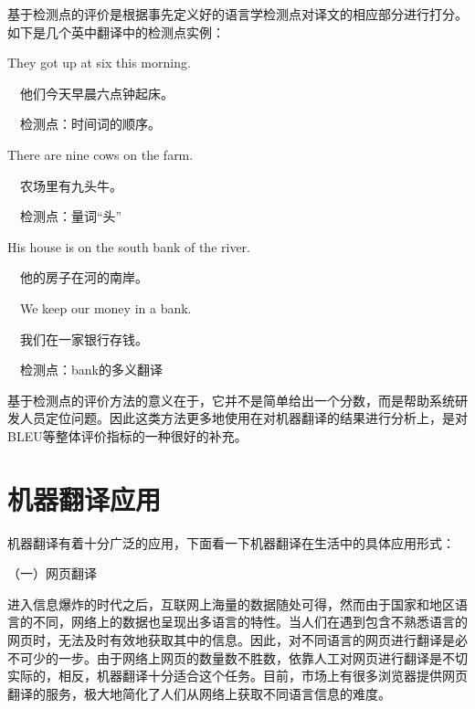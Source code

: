 \parinterval 基于检测点的评价是根据事先定义好的语言学检测点对译文的相应部分进行打分。如下是几个英中翻译中的检测点实例：

\begin{example}
They got up at six this morning.

\qquad \qquad \ \  他们今天早晨六点钟起床。

\qquad \qquad \ \  检测点：时间词的顺序。
\label{eg:1-3}
\end{example}

\begin{example}
There are nine cows on the farm.

\qquad \qquad \ \  农场里有九头牛。

\qquad \qquad \ \  检测点：量词``头''
\label{eg:1-4}
\end{example}

\begin{example}
His house is on the south bank of the river.

\qquad \qquad \ \  他的房子在河的南岸。

\qquad \qquad \ \  We keep our money in a bank.

\qquad \qquad \ \  我们在一家银行存钱。

\qquad \qquad \ \  检测点：bank的多义翻译
\label{eg:1-5}
\end{example}

\parinterval 基于检测点的评价方法的意义在于，它并不是简单给出一个分数，而是帮助系统研发人员定位问题。因此这类方法更多地使用在对机器翻译的结果进行分析上，是对BLEU等整体评价指标的一种很好的补充。


\sectionnewpage
\section{机器翻译应用}

\parinterval 机器翻译有着十分广泛的应用，下面看一下机器翻译在生活中的具体应用形式：

\parinterval （一）网页翻译

\parinterval 进入信息爆炸的时代之后，互联网上海量的数据随处可得，然而由于国家和地区语言的不同，网络上的数据也呈现出多语言的特性。当人们在遇到包含不熟悉语言的网页时，无法及时有效地获取其中的信息。因此，对不同语言的网页进行翻译是必不可少的一步。由于网络上网页的数量数不胜数，依靠人工对网页进行翻译是不切实际的，相反，机器翻译十分适合这个任务。目前，市场上有很多浏览器提供网页翻译的服务，极大地简化了人们从网络上获取不同语言信息的难度。

